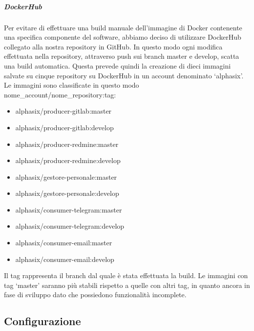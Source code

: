 			\subparagraph{DockerHub}\label{DockerHub}
			Per evitare di effettuare una build manuale dell'immagine di Docker contenente una specifica componente del software, abbiamo deciso di utilizzare DockerHub collegato alla nostra repository in GitHub. In questo modo ogni modifica effettuata nella repository, attraverso push sui branch master e develop, scatta una build automatica. Questa prevede quindi la creazione di dieci immagini salvate su cinque repository su DockerHub in un account denominato `alphasix'. Le immagini sono classificate in questo modo nome\_account/nome\_repository:tag:
			\begin{itemize}
				\item alphasix/producer-gitlab:master
				\item alphasix/producer-gitlab:develop
				\item alphasix/producer-redmine:master
				\item alphasix/producer-redmine:develop
				\item alphasix/gestore-personale:master
				\item alphasix/gestore-personale:develop
				\item alphasix/consumer-telegram:master
				\item alphasix/consumer-telegram:develop
				\item alphasix/consumer-email:master
				\item alphasix/consumer-email:develop
			\end{itemize}
			Il tag rappresenta il branch dal quale è stata effettuata la build.
			Le immagini con tag `master' saranno più stabili rispetto a quelle con altri tag, in quanto ancora in fase di sviluppo dato che possiedono funzionalità incomplete.


	\subsection{Configurazione}\label{Configurazione}

